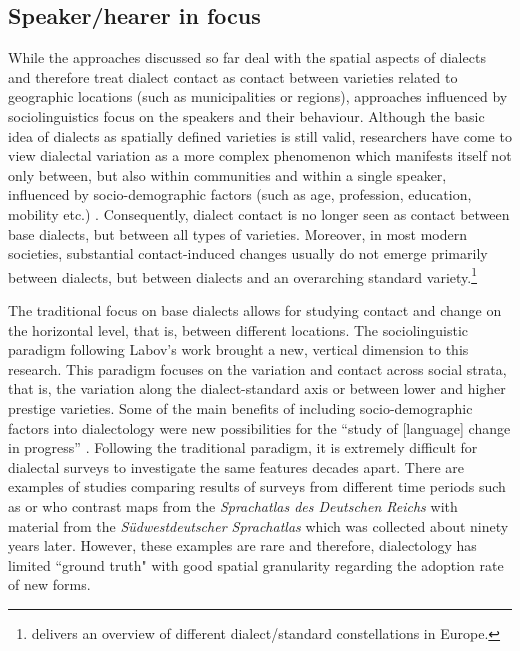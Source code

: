 \documentclass[output=paper]{langscibook}
\begin{document}
\subsection{Speaker/hearer in focus}

While the approaches discussed so far deal with the spatial aspects of dialects and therefore treat dialect contact as contact between varieties related to geographic locations (such as municipalities or regions), approaches influenced by sociolinguistics focus on the speakers and their behaviour. Although the basic idea of dialects as spatially defined varieties is still valid, researchers have come to view dialectal variation as a more complex phenomenon which manifests itself not only between, but also within communities and within a single speaker, influenced by socio-demographic factors (such as age, profession, education, mobility etc.) \parencite[cf.][]{Chambers2002}. Consequently, dialect contact is no longer seen as contact between base dialects, but between all types of varieties. 
Moreover, in most modern societies, substantial contact-induced changes usually do not emerge primarily between dialects, but between dialects and an overarching standard variety.\footnote{\textcite{Auer2005} delivers an overview of different dialect/standard constellations in Europe.}  

The traditional focus on base dialects allows for studying contact and change on the horizontal level, that is, between different locations. The sociolinguistic paradigm following Labov’s work \parencite[e.g.,][]{Labov1966} brought a new, vertical dimension to this research. This paradigm focuses on the variation and contact across social strata, that is, the variation along the dialect-standard axis or between lower and higher prestige varieties. Some of the main benefits of including socio-demographic factors into dialectology were new possibilities for the “study of [language] change in progress” \parencite[312]{Bailey2002}. Following the traditional paradigm, it is extremely difficult for dialectal surveys to investigate the same features decades apart. 
There are examples of studies comparing results of surveys from different time periods such as \textcite{Schwarz2015} or \textcite{Streck2012} who contrast maps from the \textit{Sprachatlas des Deutschen Reichs} \parencite{Wenker1888} with material from the \textit{Südwestdeutscher Sprachatlas} \parencite{Steger1989} which was collected about ninety years later. However, these examples are rare and therefore, dialectology has limited ``ground truth" with good spatial granularity regarding the adoption rate of new forms.
\end{document}

